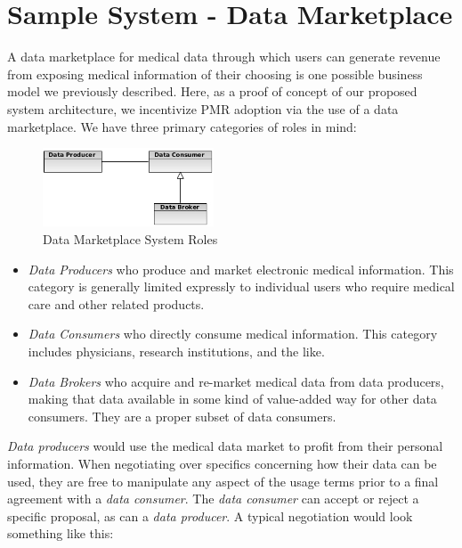 \documentclass[10pt, conference, compsocconf]{IEEEtran}
\begin{document}
\section{Sample System - Data Marketplace}
A data marketplace for medical data through which users can generate revenue from exposing medical information of their choosing is one possible business model we previously described.  Here, as a proof of concept of our proposed system architecture, we incentivize PMR adoption via the use of a data marketplace.  We have three primary categories of roles in mind:

\begin{figure}[!t]
\centering
\includegraphics[width=2in]{roles}
\caption{Data Marketplace System Roles}
\label{fig:SysRoles}
\end{figure}

\begin{itemize}

\item \textit{Data Producers} who produce and market electronic medical information.  This category is generally limited expressly to individual users who require medical care and other related products.

\item \textit{Data Consumers} who directly consume medical information.  This category includes physicians, research institutions, and the like.

\item \textit{Data Brokers} who acquire and re-market medical data from data producers, making that data available in some kind of value-added way for other data consumers.  They are a proper subset of data consumers.

\end{itemize}

\textit{Data producers} would use the medical data market to profit from their personal information.  When negotiating over specifics concerning how their data can be used, they are free to manipulate any aspect of the usage terms prior to a final agreement with a \textit{data consumer}.  The \textit{data consumer} can accept or reject a specific proposal, as can a \textit{data producer}.  A typical negotiation would look something like this:
\end{document}
